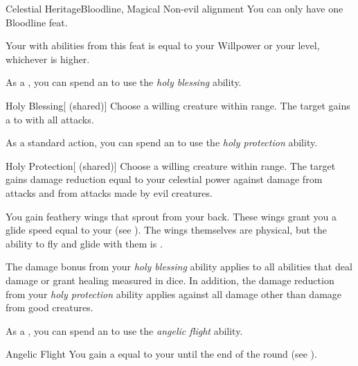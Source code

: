     \begin{feat}{Celestial Heritage}{Bloodline, Magical}
        \featpre Non-evil alignment
         You can only have one Bloodline feat.

         Your  with abilities from this feat is equal to your Willpower or your level, whichever is higher.

         As a , you can spend an  to use the \textit{holy blessing} ability.
        \begin{ability}{Holy Blessing}[ (shared)]
            Choose a willing creature within \rngclose range.
            The target gains a   to  with all attacks.
        \end{ability}

         As a standard action, you can spend an  to use the \textit{holy protection} ability.
        \begin{ability}{Holy Protection}[ (shared)]
            Choose a willing creature within \rngclose range.
            The target gains damage reduction equal to your celestial power against damage from  attacks and from attacks made by evil creatures.
        \end{ability}

         You gain feathery wings that sprout from your back.
        These wings grant you a glide speed equal to your  (see ).
        The wings themselves are physical, but the ability to fly and glide with them is .

         The damage bonus from your \textit{holy blessing} ability applies to all abilities that deal damage or grant healing measured in dice.
        In addition, the damage reduction from your \textit{holy protection} ability applies against all damage other than damage from good creatures.

         As a , you can spend an  to use the \textit{angelic flight} ability.
        \begin{ability}{Angelic Flight}
            You gain a  equal to your  until the end of the round (see ).
        \end{ability}


\end{feat}
